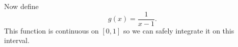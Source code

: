\documentclass{article}
\begin{document}
Now define
\[
g(x) = \frac{1}{x-1}.
\]
This function is continuous on $[0,1]$ so we can safely integrate it on this interval.
\end{document}

